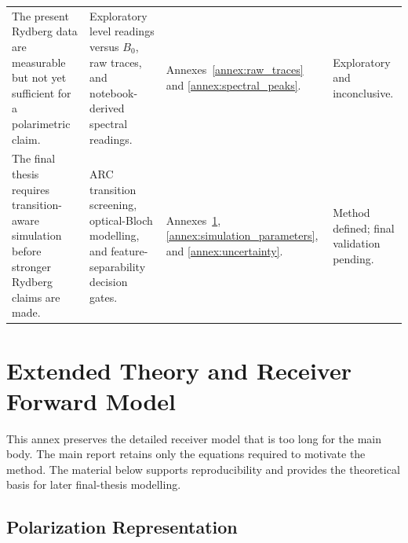 \documentclass{ieeeaccess}
\begin{document}
\begin{table}[!t]
\begin{tabular}{p{} p{} p{} p{}}
The present Rydberg data are measurable but not yet sufficient for a polarimetric claim. &
Exploratory level readings versus \(B_0\), raw traces, and notebook-derived spectral readings. &
Annexes~\ref{annex:raw_traces} and \ref{annex:spectral_peaks}. &
Exploratory and inconclusive. \\

The final thesis requires transition-aware simulation before stronger Rydberg claims are made. &
ARC transition screening, optical-Bloch modelling, and feature-separability decision gates. &
Annexes~\ref{annex:extended_theory}, \ref{annex:simulation_parameters}, and \ref{annex:uncertainty}. &
Method defined; final validation pending. \\
\hline
\end{tabular}
\end{table}

\section{Extended Theory and Receiver Forward Model}
\label{annex:extended_theory}

This annex preserves the detailed receiver model that is too long for the main body. The main report retains only the equations required to motivate the method. The material below supports reproducibility and provides the theoretical basis for later final-thesis modelling.

\subsection{Polarization Representation}
\label{annex:polarization_representation}
\end{document}

